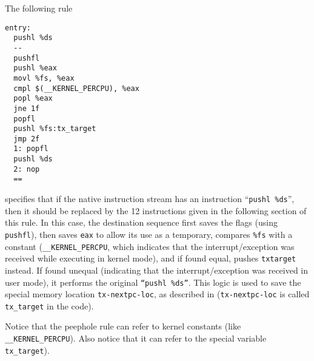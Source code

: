 \documentclass[9pt]{article}
\begin{document}
The following rule
\begin{verbatim}
entry:
  pushl %ds
  --
  pushfl
  pushl %eax
  movl %fs, %eax
  cmpl $(__KERNEL_PERCPU), %eax
  popl %eax
  jne 1f
  popfl
  pushl %fs:tx_target
  jmp 2f
  1: popfl
  pushl %ds
  2: nop
  ==
\end{verbatim}
specifies that if the native instruction stream has an instruction
``{\tt pushl \%ds}'', then it should be replaced by the 12 instructions
given in the following section of this rule. In this case, the destination
sequence first saves the flags (using {\tt pushfl}), then saves {\tt eax}
to allow its use as a temporary, compares {\tt \%fs} with a
constant ({\tt \_\_KERNEL\_PERCPU}, which indicates that the
interrupt/exception was received while executing in kernel mode), and
if found equal, pushes
{\tt txtarget} instead. If found
unequal (indicating that the interrupt/exception was received
in user mode), it performs the original
{\tt ``pushl \%ds''}. This logic is used to save the special memory
location {\tt tx-nextpc-loc}, as described in \cite{sosp13} ({\tt tx-nextpc-loc}
is called {\tt tx\_target} in the code).

Notice that the peephole rule can refer to kernel
constants (like {\tt \_\_KERNEL\_PERCPU}). Also notice that it can
refer to 
the special variable {\tt tx\_target}).
\end{document}
